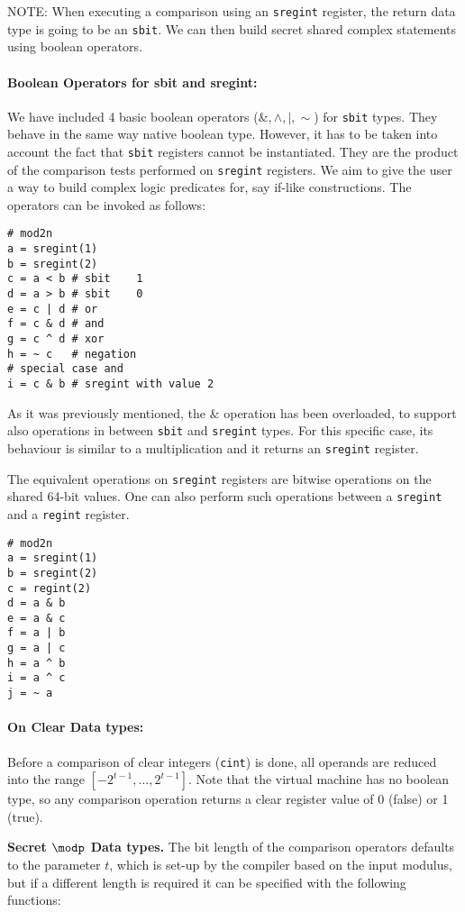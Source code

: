 \noindent
NOTE: When executing a comparison using an \verb|sregint| register, the return data type is going to be an \verb|sbit|. We can then build secret shared complex statements using boolean operators.

\paragraph{Boolean Operators for sbit and sregint:}
We have included 4 basic boolean operators ($\&, \wedge, |, \sim$) for \verb|sbit| types. 
They behave in the same way native boolean type. However, it has to be taken into account 
the fact that \verb|sbit| registers cannot be instantiated. They are the product of the 
comparison tests performed on \verb|sregint| registers. 
We aim to give the user a way to build complex logic predicates for, say if-like constructions. The operators can be invoked as follows: 
\begin{lstlisting}
# mod2n
a = sregint(1)
b = sregint(2)
c = a < b # sbit    1
d = a > b # sbit    0
e = c | d # or
f = c & d # and     
g = c ^ d # xor
h = ~ c   # negation
# special case and
i = c & b # sregint with value 2
\end{lstlisting}
As it was previously mentioned, the $\&$ operation has been overloaded, 
to support also operations in between \verb|sbit| and \verb|sregint| types. 
For this specific case, its behaviour is similar to a multiplication and it returns 
an \verb|sregint| register.

The equivalent operations on \verb|sregint| registers are bitwise operations on the 
shared 64-bit values. One can also perform such operations between a
\verb|sregint| and a \verb|regint| register.
\begin{lstlisting}
# mod2n
a = sregint(1)
b = sregint(2)
c = regint(2)
d = a & b
e = a & c
f = a | b
g = a | c
h = a ^ b
i = a ^ c
j = ~ a 
\end{lstlisting}

\paragraph{On Clear Data types:} Before a comparison of clear integers (\verb|cint|) is done,
all operands are reduced into the range $[-2^{t-1}, \dots, 2^{t-1}]$.
Note that the virtual machine has no boolean type,
so any comparison operation returns a clear register value of 0
(false) or 1 (true).

\noindent
\textbf{Secret $\modp$ Data types.}  
The bit length of the comparison operators defaults to the parameter $t$, 
which is set-up by the compiler based on the input modulus, 
but if a different length is required it can be specified with the following functions:

